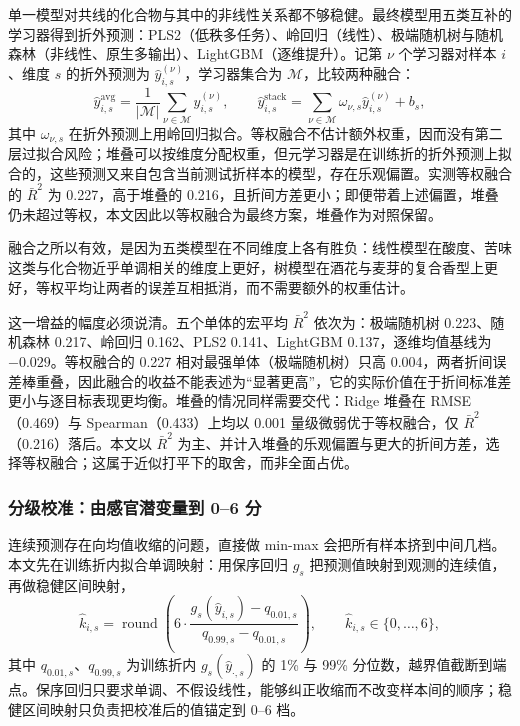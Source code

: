 ﻿\documentclass[UTF8,a4paper,zihao=-4]{ctexart}
\numberwithin{figure}{section}
\numberwithin{table}{section}
\numberwithin{equation}{section}
\begin{document}
单一模型对共线的化合物与其中的非线性关系都不够稳健。最终模型用五类互补的学习器得到折外预测：PLS2（低秩多任务）、岭回归（线性）、极端随机树与随机森林（非线性、原生多输出）、LightGBM（逐维提升）。记第 $\nu$ 个学习器对样本 $i$、维度 $s$ 的折外预测为 $\hat y^{(\nu)}_{i,s}$，学习器集合为 $\mathcal{M}$，比较两种融合：
\begin{equation}
\hat y^{\mathrm{avg}}_{i,s}=\frac{1}{|\mathcal{M}|}\sum_{\nu\in\mathcal{M}}\hat y^{(\nu)}_{i,s},
\qquad
\hat y^{\mathrm{stack}}_{i,s}=\sum_{\nu\in\mathcal{M}}\omega_{\nu,s}\hat y^{(\nu)}_{i,s}+b_s ,
\label{eq:fusion}
\end{equation}
其中 $\omega_{\nu,s}$ 在折外预测上用岭回归拟合。等权融合不估计额外权重，因而没有第二层过拟合风险；堆叠可以按维度分配权重，但元学习器是在训练折的折外预测上拟合的，这些预测又来自包含当前测试折样本的模型，存在乐观偏置。实测等权融合的 $\bar R^2$ 为 0.227，高于堆叠的 0.216，且折间方差更小；即便带着上述偏置，堆叠仍未超过等权，本文因此以等权融合为最终方案，堆叠作为对照保留。

融合之所以有效，是因为五类模型在不同维度上各有胜负：线性模型在酸度、苦味这类与化合物近乎单调相关的维度上更好，树模型在酒花与麦芽的复合香型上更好，等权平均让两者的误差互相抵消，而不需要额外的权重估计。

这一增益的幅度必须说清。五个单体的宏平均 $\bar R^2$ 依次为：极端随机树 0.223、随机森林 0.217、岭回归 0.162、PLS2 0.141、LightGBM 0.137，逐维均值基线为 $-0.029$。等权融合的 0.227 相对最强单体（极端随机树）只高 0.004，两者折间误差棒重叠，因此融合的收益不能表述为“显著更高”，它的实际价值在于折间标准差更小与逐目标表现更均衡。堆叠的情况同样需要交代：Ridge 堆叠在 RMSE（0.469）与 Spearman（0.433）上均以 0.001 量级微弱优于等权融合，仅 $\bar R^2$（0.216）落后。本文以 $\bar R^2$ 为主、并计入堆叠的乐观偏置与更大的折间方差，选择等权融合；这属于近似打平下的取舍，而非全面占优。

\subsubsection{分级校准：由感官潜变量到 0--6 分}

连续预测存在向均值收缩的问题，直接做 min-max 会把所有样本挤到中间几档。本文先在训练折内拟合单调映射：用保序回归 $g_s$ 把预测值映射到观测的连续值，再做稳健区间映射，
\begin{equation}
\hat k_{i,s}=\operatorname{round}\left(6\cdot\frac{g_s(\hat y_{i,s})-q_{0.01,s}}{q_{0.99,s}-q_{0.01,s}}\right),\qquad \hat k_{i,s}\in\{0,\dots,6\},
\label{eq:grade}
\end{equation}
其中 $q_{0.01,s}$、$q_{0.99,s}$ 为训练折内 $g_s(\hat y_{\cdot,s})$ 的 1\% 与 99\% 分位数，越界值截断到端点。保序回归只要求单调、不假设线性，能够纠正收缩而不改变样本间的顺序；稳健区间映射只负责把校准后的值锚定到 0--6 档。
\end{document}

